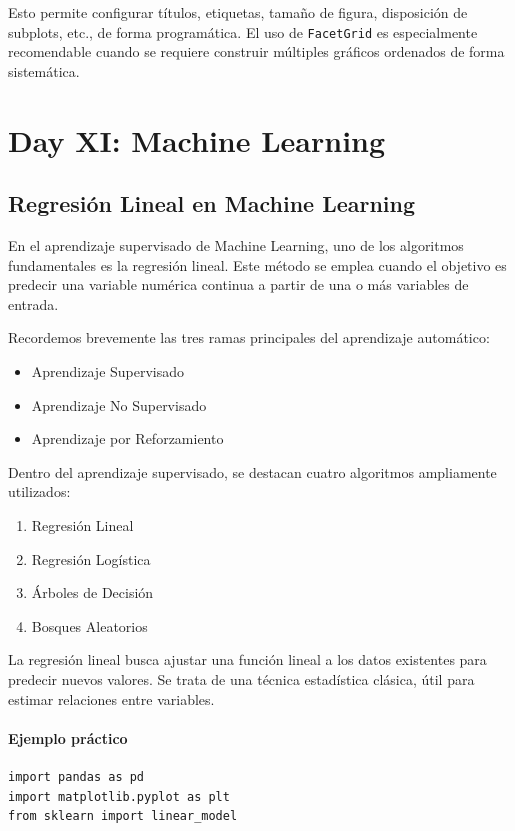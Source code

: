 \documentclass{article}
\theoremstyle{nonumberplain}
\begin{document}
Esto permite configurar títulos, etiquetas, tamaño de figura, disposición de subplots, etc., de forma programática. El uso de \texttt{FacetGrid} es especialmente recomendable cuando se requiere construir múltiples gráficos ordenados de forma sistemática.

\section*{Day XI: Machine Learning}
\subsection*{Regresión Lineal en Machine Learning}

En el aprendizaje supervisado de Machine Learning, uno de los algoritmos fundamentales es la regresión lineal. Este método se emplea cuando el objetivo es predecir una variable numérica continua a partir de una o más variables de entrada.

Recordemos brevemente las tres ramas principales del aprendizaje automático:

\begin{itemize}
    \item Aprendizaje Supervisado
    \item Aprendizaje No Supervisado
    \item Aprendizaje por Reforzamiento
\end{itemize}

Dentro del aprendizaje supervisado, se destacan cuatro algoritmos ampliamente utilizados:

\begin{enumerate}
    \item Regresión Lineal
    \item Regresión Logística
    \item Árboles de Decisión
    \item Bosques Aleatorios
\end{enumerate}

La regresión lineal busca ajustar una función lineal a los datos existentes para predecir nuevos valores. Se trata de una técnica estadística clásica, útil para estimar relaciones entre variables.

\paragraph{Ejemplo práctico}

\begin{verbatim}
import pandas as pd
import matplotlib.pyplot as plt
from sklearn import linear_model
\end{verbatim}
\end{document}
